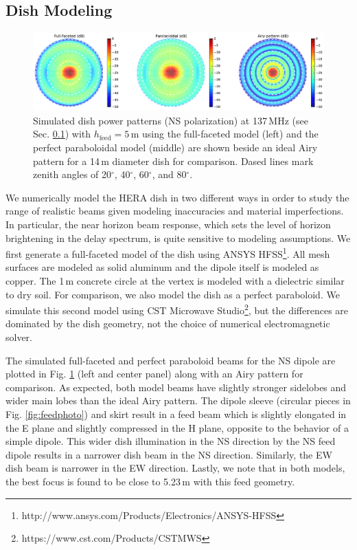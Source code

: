 \documentclass{emulateapj}
\begin{document}
\subsection{Dish Modeling}
\label{sec:dishmodels}

\begin{figure}
\centering
\includegraphics[width=7in]{dave195_rich195_airy_beams.pdf}
\caption{Simulated dish power patterns (NS polarization) at 137\,MHz (see Sec. \ref{sec:dishmodels}) with $h_\text{feed}=5$\,m using the full-faceted model (left) and the perfect paraboloidal model (middle) are shown beside an ideal Airy pattern for a 14\,m diameter dish for comparison. Dased lines mark zenith angles of 20$^\circ$, 40$^\circ$, 60$^\circ$, and 80$^\circ$.}
\label{fig:modelbeams}
\end{figure}

We numerically model the HERA dish in two different ways in order to study the range of realistic beams given modeling inaccuracies and material imperfections. In particular, the near horizon beam response, which sets the level of horizon brightening in the delay spectrum, is quite sensitive to modeling assumptions. We first generate a full-faceted model of the dish using ANSYS HFSS\footnote{http://www.ansys.com/Products/Electronics/ANSYS-HFSS}. All mesh surfaces are modeled as solid aluminum and the dipole itself is modeled as copper. The 1\,m concrete circle at the vertex is modeled with a dielectric similar to dry soil. For comparison, we also model the dish as a perfect paraboloid. We simulate this second model using CST Microwave Studio\footnote{https://www.cst.com/Products/CSTMWS}, but the differences are dominated by the dish geometry, not the choice of numerical electromagnetic solver. 

The simulated full-faceted and perfect paraboloid beams for the NS dipole are plotted in Fig. \ref{fig:modelbeams} (left and center panel) along with an Airy pattern for comparison. As expected, both model beams have slightly stronger sidelobes and wider main lobes than the ideal Airy pattern. The dipole sleeve (circular pieces in Fig. \ref{fig:feedphoto}) and skirt result in a feed beam which is slightly elongated in the E plane and slightly compressed in the H plane, opposite to the behavior of a simple dipole. This wider dish illumination in the NS direction by the NS feed dipole results in a narrower dish beam in the NS direction. Similarly, the EW dish beam is narrower in the EW direction. Lastly, we note that in both models, the best focus is found to be close to 5.23\,m with this feed geometry.
\end{document}
